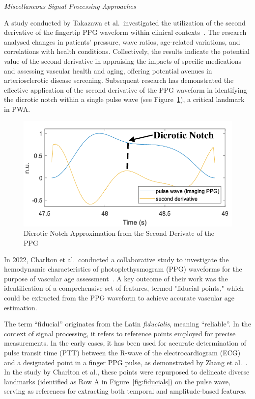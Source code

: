 \vspace{0.2cm}
\textit{Miscellaneous Signal Processing Approaches}
\vspace{0.2cm}

A study conducted by Takazawa et al.\ investigated the utilization of the second derivative of the fingertip PPG waveform within clinical contexts~\cite{takazawaAssessmentVasoactiveAgents1998}.
The research analysed changes in patients' pressure, wave ratios, age-related variations, and correlations with health conditions.
Collectively, the results indicate the potential value of the second derivative in appraising the impacts of specific medications and assessing vascular health and aging, offering potential avenues in arteriosclerotic disease screening.
Subsequent research has demonstrated the effective application of the second derivative of the PPG waveform in identifying the dicrotic notch within a single pulse wave (see Figure~\ref{fig:dic_notch}), a critical landmark in PWA\@.

\begin{figure}[h]
    \centering
    \includegraphics[scale=0.6]{images/sp/dic_notch}
    \caption{Dicrotic Notch Approximation from the Second Derivate of the PPG~\cite{djeldjliImagingPhotoplethysmographySignal2019}}
    \label{fig:dic_notch}
\end{figure}

In 2022, Charlton et al.\ conducted a collaborative study to investigate the hemodynamic characteristics of photoplethysmogram (PPG) waveforms for the purpose of vascular age assessment~\cite{charltonAssessingHemodynamicsPhotoplethysmogram2022}. A key outcome of their work was the identification of a comprehensive set of features, termed "fiducial points," which could be extracted from the PPG waveform to achieve accurate vascular age estimation.

The term \enquote{fiducial} originates from the Latin \textit{fiducialis}, meaning \enquote{reliable}.
In the context of signal processing, it refers to reference points employed for precise measurements.
In the early cases, it has been used for accurate determination of pulse transit time (PTT) between the R-wave of the electrocardiogram (ECG) and a designated point in a finger PPG pulse, as demonstrated by Zhang et al.~\cite{zhangEffectLocalCold2005}.
In the study by Charlton et al., these points were repurposed to delineate diverse landmarks (identified as Row A in Figure~\ref{fig:fiducials}) on the pulse wave, serving as references for extracting both temporal and amplitude-based features.

